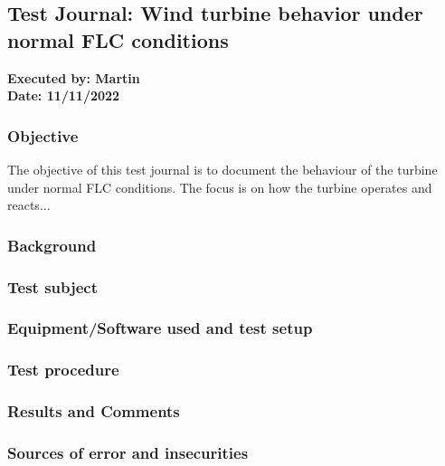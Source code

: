 \subsection{Test Journal: Wind turbine behavior under normal FLC conditions} \label{app:tj_02}

\textbf{Executed by: Martin} \\
\textbf{Date: 11/11/2022}

\subsubsection{Objective}
The objective of this test journal is to document the behaviour of the turbine under normal FLC conditions. The focus is on how the turbine operates and reacts...

\subsubsection{Background}


\subsubsection{Test subject}


\subsubsection{Equipment/Software used and test setup}


\subsubsection{Test procedure}


\subsubsection{Results and Comments}


\subsubsection{Sources of error and insecurities}
